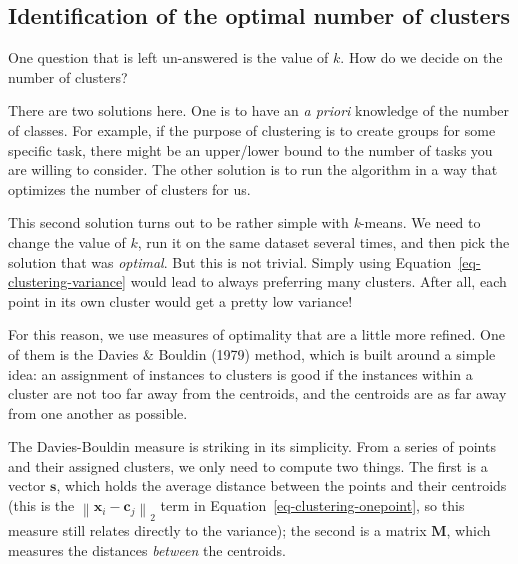 \documentclass[
  letterpaper,
]{scrbook}
\begin{document}
\subsection{Identification of the optimal number of
clusters}\label{sec-clustering-optimality}

One question that is left un-answered is the value of \(k\). How do we
decide on the number of clusters?

There are two solutions here. One is to have an \emph{a priori}
knowledge of the number of classes. For example, if the purpose of
clustering is to create groups for some specific task, there might be an
upper/lower bound to the number of tasks you are willing to consider.
The other solution is to run the algorithm in a way that optimizes the
number of clusters for us.


This second solution turns out to be rather simple with \emph{k}-means.
We need to change the value of \(k\), run it on the same dataset several
times, and then pick the solution that was \emph{optimal}. But this is
not trivial. Simply using Equation~\ref{eq-clustering-variance} would
lead to always preferring many clusters. After all, each point in its
own cluster would get a pretty low variance!

For this reason, we use measures of optimality that are a little more
refined. One of them is the Davies \& Bouldin (1979) method, which is
built around a simple idea: an assignment of instances to clusters is
good if the instances within a cluster are not too far away from the
centroids, and the centroids are as far away from one another as
possible.

The Davies-Bouldin measure is striking in its simplicity. From a series
of points and their assigned clusters, we only need to compute two
things. The first is a vector \(\mathbf{s}\), which holds the average
distance between the points and their centroids (this is the
\(\left\|\mathbf{x}_i-\mathbf{c}_j\right\|_2\) term in
Equation~\ref{eq-clustering-onepoint}, so this measure still relates
directly to the variance); the second is a matrix \(\mathbf{M}\), which
measures the distances \emph{between} the centroids.
\end{document}
